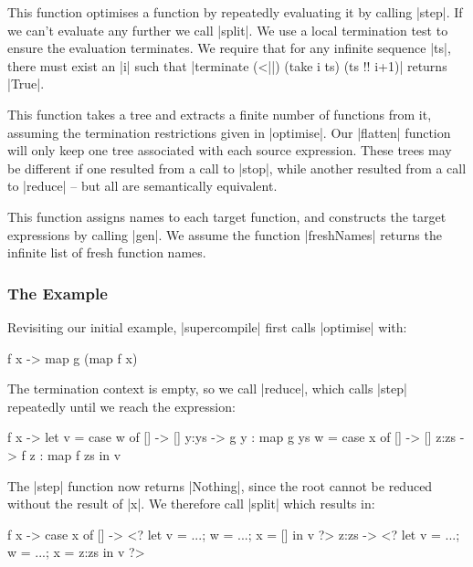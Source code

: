 \documentclass[draft]{sigplanconf}
\begin{document}
 This function optimises a function by repeatedly evaluating it by calling |step|. If we can't evaluate any further we call |split|. We use a local termination test to ensure the evaluation terminates. We require that for any infinite sequence |ts|, there must exist an |i| such that |terminate (<||) (take i ts) (ts !! i+1)| returns |True|.

 This function takes a tree and extracts a finite number of functions from it, assuming the termination restrictions given in |optimise|. Our |flatten| function will only keep one tree associated with each source expression. These trees may be different if one resulted from a call to |stop|, while another resulted from a call to |reduce| -- but all are semantically equivalent.

 This function assigns names to each target function, and constructs the target expressions by calling |gen|. We assume the function |freshNames| returns the infinite list of fresh function names.

\subsubsection{The Example}
\label{sec:manager_example}

Revisiting our initial example, |supercompile| first calls |optimise| with:

\begin{code}
\g f x -> map g (map f x)
\end{code}

The termination context is empty, so we call |reduce|, which calls |step| repeatedly until we reach the expression:

\begin{code}
\g f x ->  let  v = case  w of
                          [] -> []
                          y:ys -> g y : map g ys
                w = case  x of
                          [] -> []
                          z:zs -> f z : map f zs
           in   v
\end{code}

The |step| function now returns |Nothing|, since the root cannot be reduced without the result of |x|. We therefore call |split| which results in:

\begin{code}
\g f x -> case  x of
                []    -> <? let v = ...; w = ...; x = [] in v ?>
                z:zs  -> <? let v = ...; w = ...; x = z:zs in v ?>
\end{code}
\end{document}
